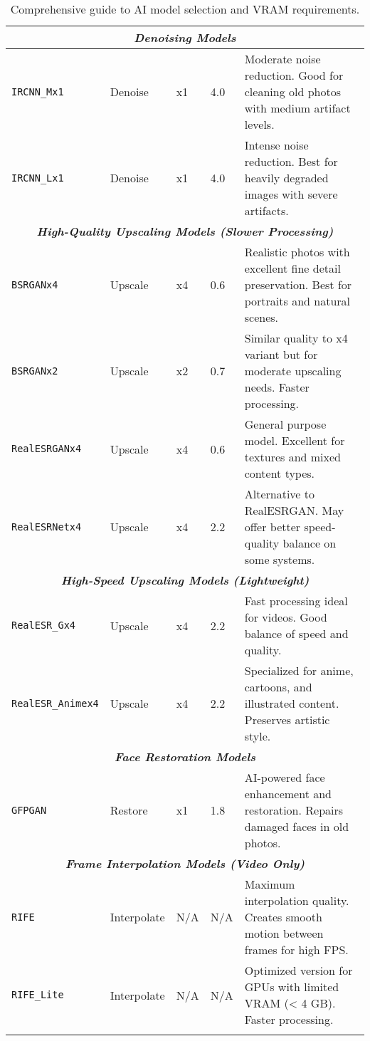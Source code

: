 \documentclass[11pt, a4paper]{article}
\begin{document}
\begin{longtable}{p{2.8cm} p{1.8cm} p{1.2cm} p{1.5cm} p{7.2cm}}
\multicolumn{5}{c}{\textit{\textbf{Denoising Models}}} \\
\midrule
\texttt{IRCNN\_Mx1} & Denoise & x1 & 4.0 & Moderate noise reduction. Good for cleaning old photos with medium artifact levels. \\
\texttt{IRCNN\_Lx1} & Denoise & x1 & 4.0 & Intense noise reduction. Best for heavily degraded images with severe artifacts. \\
\midrule
\multicolumn{5}{c}{\textit{\textbf{High-Quality Upscaling Models (Slower Processing)}}} \\
\midrule
\texttt{BSRGANx4} & Upscale & x4 & 0.6 & Realistic photos with excellent fine detail preservation. Best for portraits and natural scenes. \\
\texttt{BSRGANx2} & Upscale & x2 & 0.7 & Similar quality to x4 variant but for moderate upscaling needs. Faster processing. \\
\texttt{RealESRGANx4} & Upscale & x4 & 0.6 & General purpose model. Excellent for textures and mixed content types. \\
\texttt{RealESRNetx4} & Upscale & x4 & 2.2 & Alternative to RealESRGAN. May offer better speed-quality balance on some systems. \\
\midrule
\multicolumn{5}{c}{\textit{\textbf{High-Speed Upscaling Models (Lightweight)}}} \\
\midrule
\texttt{RealESR\_Gx4} & Upscale & x4 & 2.2 & Fast processing ideal for videos. Good balance of speed and quality. \\
\texttt{RealESR\_Animex4} & Upscale & x4 & 2.2 & Specialized for anime, cartoons, and illustrated content. Preserves artistic style. \\
\midrule
\multicolumn{5}{c}{\textit{\textbf{Face Restoration Models}}} \\
\midrule
\texttt{GFPGAN} & Restore & x1 & 1.8 & AI-powered face enhancement and restoration. Repairs damaged faces in old photos. \\
\midrule
\multicolumn{5}{c}{\textit{\textbf{Frame Interpolation Models (Video Only)}}} \\
\midrule
\texttt{RIFE} & Interpolate & N/A & N/A & Maximum interpolation quality. Creates smooth motion between frames for high FPS. \\
\texttt{RIFE\_Lite} & Interpolate & N/A & N/A & Optimized version for GPUs with limited VRAM (< 4 GB). Faster processing. \\
\midrule
\bottomrule
\caption{Comprehensive guide to AI model selection and VRAM requirements.}
\label{tab:modelos}
\end{longtable}
\end{document}
